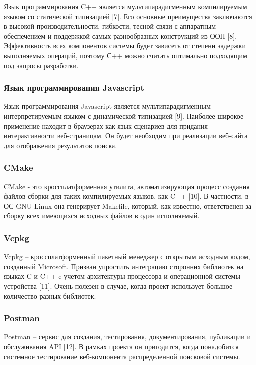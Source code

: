 Язык программирования C++ является мультипарадигменным компилируемым языком со статической типизацией [7]. Его основные преимущества заключаются в высокой производительности, гибкости, тесной связи с аппаратным обеспечением и поддержкой самых разнообразных конструкций из ООП [8]. Эффективность всех компонентов системы будет зависеть от степени задержки выполняемых операций, поэтому С++ можно считать оптимально подходящим под запросы разработки.

\subsubsection{Язык программирования Javascript}

Язык программирования Javascript является мультипарадигменным интерпретируемым языком с динамической типизацией [9]. Наиболее широкое применение находит в браузерах как язык сценариев для придания интерактивности веб-страницам. Он будет необходим при реализации веб-сайта для отображения результатов поиска.  

\subsubsection{CMake}

CMake - это кроссплатформенная утилита, автоматизирующая процесс создания файлов сборки для таких компилируемых языков, как C++ [10]. В частности, в ОС GNU Linux она генерирует Makefile, который, как известно, ответственен за сборку всех имеющихся исходных файлов в один исполняемый. 

\subsubsection{Vcpkg}
Vcpkg -- кроссплатформенный пакетный менеджер с открытым исходным кодом, созданный Microsoft. Призван упростить интеграцию сторонних библиотек на языках C и C++ c учетом архитектуры процессора и операционной системы устройства [11]. Очень полезен в случае, когда проект использует большое количество разных библиотек.

\subsubsection{Postman}
Postman -- сервис для создания, тестирования, документирования, публикации и обслуживания API [12]. В рамках проекта он пригодится, когда понадобится системное тестирование веб-компонента распределенной поисковой системы.

